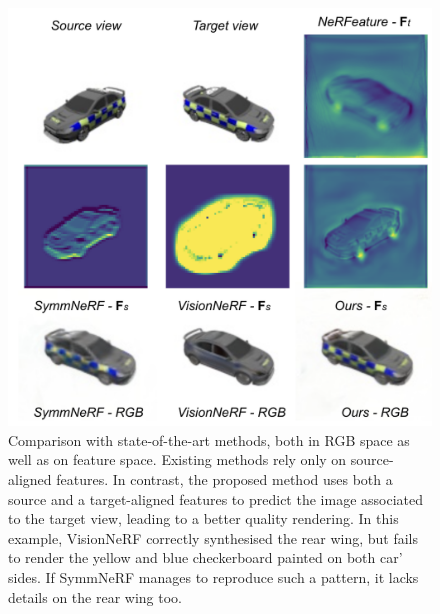 \begin{figure}[htp!]
    \center
  \includegraphics[width=.65\textwidth]{images/epinerf/abstract_figure.png}
  \caption{Comparison with state-of-the-art methods, both in RGB space as well as on feature space. Existing methods rely only on source-aligned features. In contrast, the proposed method uses both a source and a target-aligned features to predict the image associated to the target view, leading to a better quality rendering. In this example, VisionNeRF \citep{lin2023vision} correctly synthesised the rear wing, but fails to render the yellow and blue checkerboard painted on both car' sides. If SymmNeRF \citep{li2022symmnerf} manages to reproduce such a pattern, it lacks details on the rear wing too.}
  \label{fig:res_car_intro}
\end{figure}

